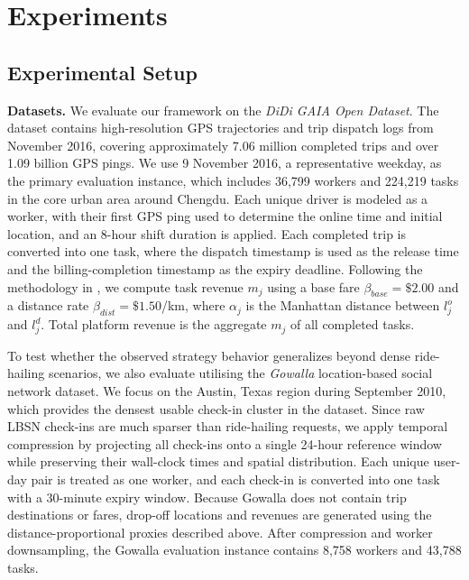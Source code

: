 \section{Experiments}
\label{sec:experiments}


\subsection{Experimental Setup}
\label{sec:setup}

\textbf{Datasets.}
\label{sec:datasets}
We evaluate our framework on the \textit{DiDi GAIA Open Dataset}. The dataset contains high-resolution GPS trajectories and trip dispatch logs from November 2016, covering approximately 7.06 million completed trips and over 1.09 billion GPS pings. We use 9 November 2016, a representative weekday, as the primary evaluation instance, which includes 36,799 workers and 224,219 tasks in the core urban area around Chengdu. Each unique driver is modeled as a worker, with their first GPS ping used to determine the online time and initial location, and an 8-hour shift duration is applied. Each completed trip is converted into one task, where the dispatch timestamp is used as the release time and the billing-completion timestamp as the expiry deadline. Following the methodology in \cite{CR-04}, we compute task revenue $m_j$ using a base fare $\beta_{base} = \$2.00$ and a distance rate $\beta_{dist} = \$1.50$/km, where $\alpha_j$ is the Manhattan distance between $l_j^o$ and $l_j^d$. Total platform revenue is the aggregate $m_j$ of all completed tasks. 

To test whether the observed strategy behavior generalizes beyond dense ride-hailing scenarios, we also evaluate utilising the \textit{Gowalla} location-based social network dataset. We focus on the Austin, Texas region during September 2010, which provides the densest usable check-in cluster in the dataset. Since raw LBSN check-ins are much sparser than ride-hailing requests, we apply temporal compression by projecting all check-ins onto a single 24-hour reference window while preserving their wall-clock times and spatial distribution. Each unique user-day pair is treated as one worker, and each check-in is converted into one task with a 30-minute expiry window. Because Gowalla does not contain trip destinations or fares, drop-off locations and revenues are generated using the distance-proportional proxies described above. After compression and worker downsampling, the Gowalla evaluation instance contains 8,758 workers and 43,788 tasks.

